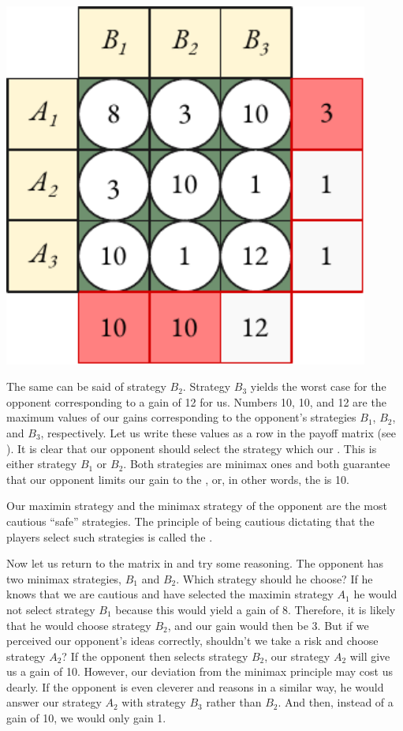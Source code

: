  \begin{marginfigure}[-1cm]%
 \centering
 \includegraphics[width=0.9\textwidth]{figures/two-player3.pdf}
 \end{marginfigure}
The same can be said of strategy $B_{2}$. Strategy $B_{3}$ yields the worst case
for the opponent corresponding to a gain of 12 for us. Numbers 10, 10,
and 12 are the maximum values of our gains corresponding to the
opponent's strategies $B_{1}$, $B_{2}$, and $B_{3}$, respectively. Let us write these values as a row in the payoff matrix (see ). It is clear that our opponent should select the strategy which  our . This is either strategy $B_{1}$ or $B_{2}$. Both strategies are minimax ones and both guarantee that our opponent limits our gain to the , or, in other words, the  is 10.

Our maximin strategy and the minimax strategy of the opponent are
the most cautious ``safe'' strategies. The principle of being cautious
dictating that the players select such strategies is called the .

Now let us return to the matrix in  and try some reasoning. The opponent has two minimax strategies,  $B_{1}$ and  $B_{2}$. Which strategy should he choose? If he knows that we are cautious and have selected the maximin strategy  $A_{1}$ he would not select strategy  $B_{1}$ because this would yield a gain of 8. Therefore, it is likely that he would choose
strategy $B_{2}$, and our gain would then be 3. But if we perceived our
opponent's ideas correctly, shouldn't we take a risk and choose strategy
 $A_{2}$? If the opponent then selects strategy  $B_{2}$, our strategy  $A_{2}$ will give us a gain of 10. However, our deviation from the minimax principle may
cost us dearly. If the opponent is even cleverer and reasons in a similar
way, he would answer our strategy  $A_{2}$ with strategy  $B_{3}$ rather than  $B_{2}$. And then, instead of a gain of 10, we would only gain 1.


